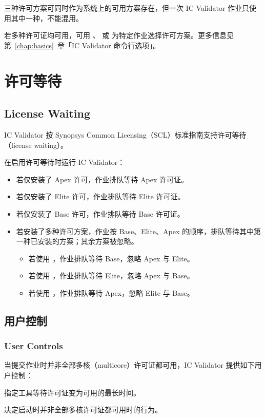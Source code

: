 三种许可方案可同时作为系统上的可用方案存在，但一次 IC Validator 作业只使用其中一种，不能混用。

若多种许可证均可用，可用 、 或  为特定作业选择许可方案。更多信息见第~\ref{chap:basics}~章「IC Validator 命令行选项」。

\section{许可等待}
\subsection*{License Waiting}

IC Validator 按 Synopsys Common Licensing（SCL）标准指南支持许可等待（license waiting）。

在启用许可等待时运行 IC Validator：
\begin{itemize}
  \item 若仅安装了 Apex 许可，作业排队等待 Apex 许可证。
  \item 若仅安装了 Elite 许可，作业排队等待 Elite 许可证。
  \item 若仅安装了 Base 许可，作业排队等待 Base 许可证。
  \item 若安装了多种许可方案，作业按 Base、Elite、Apex 的顺序，排队等待其中第一种已安装的方案；其余方案被忽略。
  \begin{itemize}
    \item 若使用 ，作业排队等待 Base，忽略 Apex 与 Elite。
    \item 若使用 ，作业排队等待 Elite，忽略 Apex 与 Base。
    \item 若使用 ，作业排队等待 Apex，忽略 Elite 与 Base。
  \end{itemize}
\end{itemize}

\subsection{用户控制}
\subsubsection*{User Controls}

当提交作业时并非全部多核（multicore）许可证都可用，IC Validator 提供如下用户控制：

\begin{description}[style=nextline, leftmargin=1.2em]
  \item[\cmd{License\_wait\_duration}]
    指定工具等待许可证变为可用的最长时间。
  \item[\cmd{License\_mode}]
    决定启动时并非全部多核许可证都可用时的行为。
\end{description}

